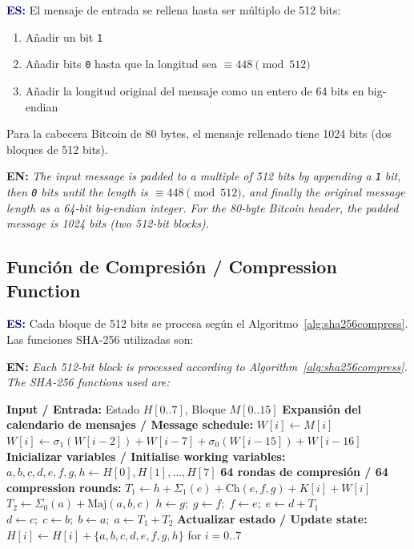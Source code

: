 \documentclass[12pt,a4paper]{article}
\newcommand{\bsubsection}[2]{%
    \subsection{#1 \textnormal{\small\color{accentblue}/ #2}}%
}
\newenvironment{bilingual}{%
    \par\medskip
}{%
    \par\medskip
}
\newcommand{\espara}[1]{\noindent\textcolor{darkblue}{\textbf{ES:}} #1\par\smallskip}
\newcommand{\enpara}[1]{\noindent\textcolor{accentblue}{\textbf{EN:}} \textit{#1}\par\smallskip}
\begin{document}
\begin{bilingual}
\espara{%
El mensaje de entrada se rellena hasta ser m\'ultiplo de 512 bits:
\begin{enumerate}[leftmargin=2em]
    \item A\~nadir un bit \texttt{1}
    \item A\~nadir bits \texttt{0} hasta que la longitud sea $\equiv 448 \pmod{512}$
    \item A\~nadir la longitud original del mensaje como un entero de 64 bits en big-endian
\end{enumerate}
Para la cabecera Bitcoin de 80 bytes, el mensaje rellenado tiene 1024 bits (dos bloques de 512 bits).}

\enpara{%
The input message is padded to a multiple of 512 bits by appending a
\texttt{1} bit, then \texttt{0} bits until the length is $\equiv 448
\pmod{512}$, and finally the original message length as a 64-bit
big-endian integer. For the 80-byte Bitcoin header, the padded message
is 1024 bits (two 512-bit blocks).}
\end{bilingual}

\bsubsection{Funci\'on de Compresi\'on}{Compression Function}

\begin{bilingual}
\espara{%
Cada bloque de 512 bits se procesa seg\'un el Algoritmo~\ref{alg:sha256compress}.
Las funciones SHA-256 utilizadas son:}

\enpara{%
Each 512-bit block is processed according to Algorithm~\ref{alg:sha256compress}.
The SHA-256 functions used are:}
\end{bilingual}

\begin{algorithm}[H]
    \caption{SHA-256 Compress / Compresi\'on SHA-256}
    \label{alg:sha256compress}
    \begin{algorithmic}[1]
        \STATE \textbf{Input / Entrada:} Estado $H[0..7]$, Bloque $M[0..15]$
        \STATE \textbf{Expansi\'on del calendario de mensajes / Message schedule:}
            \STATE $W[i] \leftarrow M[i]$
        \ENDFOR
            \STATE $W[i] \leftarrow \sigma_1(W[i{-}2]) + W[i{-}7] + \sigma_0(W[i{-}15]) + W[i{-}16]$
        \ENDFOR
        \STATE \textbf{Inicializar variables / Initialise working variables:}
        \STATE $a,b,c,d,e,f,g,h \leftarrow H[0],H[1],\ldots,H[7]$
        \STATE \textbf{64 rondas de compresi\'on / 64 compression rounds:}
            \STATE $T_1 \leftarrow h + \Sigma_1(e) + \text{Ch}(e,f,g) + K[i] + W[i]$
            \STATE $T_2 \leftarrow \Sigma_0(a) + \text{Maj}(a,b,c)$
            \STATE $h \leftarrow g;\; g \leftarrow f;\; f \leftarrow e;\; e \leftarrow d + T_1$
            \STATE $d \leftarrow c;\; c \leftarrow b;\; b \leftarrow a;\; a \leftarrow T_1 + T_2$
        \ENDFOR
        \STATE \textbf{Actualizar estado / Update state:}
        \STATE $H[i] \leftarrow H[i] + \{a,b,c,d,e,f,g,h\}$ for $i = 0..7$
    \end{algorithmic}
\end{algorithm}
\end{document}
